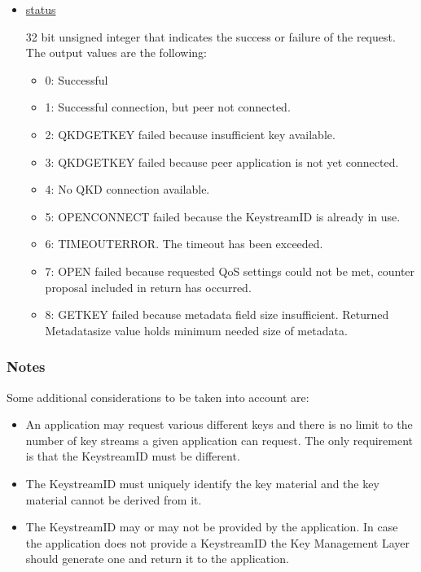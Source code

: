 \begin{refsection}
\begin{itemize}
\begin{itemize}
		\end{itemize}
		
	\item\underline{status}
	
		32 bit unsigned integer that indicates the success or failure of the request. The output values are the following:
		
		\begin{itemize}
			\item{0: }
				Successful
			\item{1: }
				Successful connection, but peer not connected.
			\item{2: }
				QKD\textunderscore GET\textunderscore KEY failed because insufficient key available.
			\item{3: }
				QKD\textunderscore GET\textunderscore KEY failed because peer application is not yet connected.
			\item{4: }
				No QKD connection available.
			\item{5: }
				OPEN\textunderscore CONNECT failed because the Key\textunderscore stream\textunderscore ID is already in use.
			\item{6: }
				TIMEOUT\textunderscore ERROR. The timeout has been exceeded.
			\item{7: }
				OPEN failed because requested QoS settings could not be met, counter proposal included in return has occurred.
			\item{8: }
				GET\textunderscore KEY failed because metadata field size insufficient. Returned Metadata\textunderscore size value holds minimum needed size of metadata.
		\end{itemize}
			
\end{itemize}

\subsubsection{Notes}

Some additional considerations to be taken into account are:
\begin{itemize}
	\item
		An application may request various different keys and there is no limit to the number of key streams a given application can request. The only requirement is that the Key\textunderscore stream\textunderscore ID must be different. 
	\item
		The Key\textunderscore stream\textunderscore ID must uniquely identify the key material and the key material cannot be derived from it.
	\item
		The Key\textunderscore stream\textunderscore ID may or may not be provided by the application. In case the application does not provide a Key\textunderscore stream\textunderscore ID the Key Management Layer should generate one and return it to the application.
\end{itemize}


\end{refsection}
